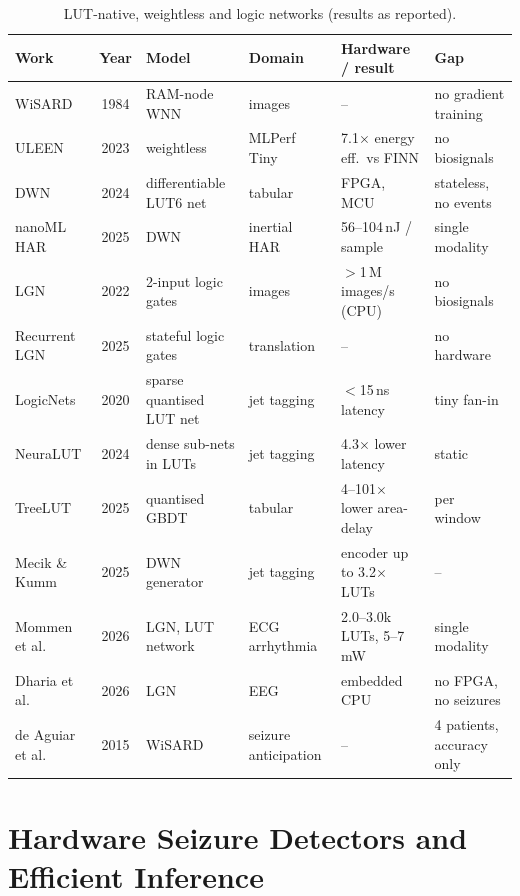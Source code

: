 \begin{table}[htbp]
\centering\small
\caption{LUT-native, weightless and logic networks (results as reported).}\label{tab:lit-lut}
\begin{tabularx}{\textwidth}{@{}P{30mm}cP{27mm}P{22mm}LL@{}}
\toprule
\textbf{Work} & \textbf{Year} & \textbf{Model} & \textbf{Domain} & \textbf{Hardware / result} & \textbf{Gap}\\
\midrule
WiSARD \cite{aleksander1984wisard} & 1984 & RAM-node WNN & images & -- & no gradient training\\
ULEEN \cite{susskind2023uleen} & 2023 & weightless & MLPerf Tiny & 7.1$\times$ energy eff.\ vs FINN & no biosignals\\
DWN \cite{bacellar2024dwn} & 2024 & differentiable LUT6 net & tabular & FPGA, MCU & stateless, no events\\
nanoML HAR \cite{bacellar2025nanoml} & 2025 & DWN & inertial HAR & 56--104\,nJ / sample & single modality\\
LGN \cite{petersen2022dlgn} & 2022 & 2-input logic gates & images & $>$1\,M images/s (CPU) & no biosignals\\
Recurrent LGN \cite{buhrer2025rdlgn} & 2025 & stateful logic gates & translation & -- & no hardware\\
LogicNets \cite{umuroglu2020logicnets} & 2020 & sparse quantised LUT net & jet tagging & $<$15\,ns latency & tiny fan-in\\
NeuraLUT \cite{andronic2024neuralut} & 2024 & dense sub-nets in LUTs & jet tagging & 4.3$\times$ lower latency & static\\
TreeLUT \cite{khataei2025treelut} & 2025 & quantised GBDT & tabular & 4--101$\times$ lower area-delay & per window\\
Mecik \& Kumm \cite{mecik2025thermo} & 2025 & DWN generator & jet tagging & encoder up to 3.2$\times$ LUTs & --\\
Mommen et al. \cite{mommen2026ecg} & 2026 & LGN, LUT network & ECG arrhythmia & 2.0--3.0k LUTs, 5--7\,mW & single modality\\
Dharia et al. \cite{dharia2026eeglgn} & 2026 & LGN & EEG & embedded CPU & no FPGA, no seizures\\
de Aguiar et al. \cite{deaguiar2015wisard} & 2015 & WiSARD & seizure anticipation & -- & 4 patients, accuracy only\\
\bottomrule
\end{tabularx}
\end{table}

\section{Hardware Seizure Detectors and Efficient Inference}\label{sec:lit-hw}


